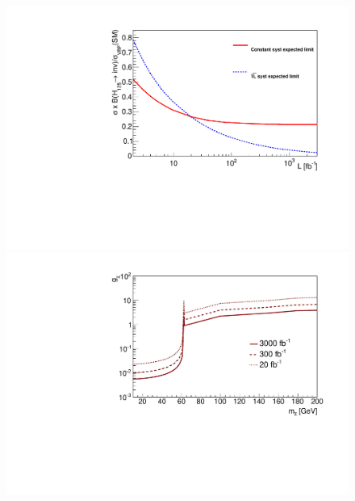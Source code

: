\begin{figure}
  \includegraphics[width=.65\largefigwidth]{plots/interp/phenoprojectedvbflimit.pdf}
  \includegraphics[width=.65\largefigwidth]{plots/interp/125higgsgchilimit.pdf}
  \caption{}%
  \label{fig:smprojectedlimits}
\end{figure}
